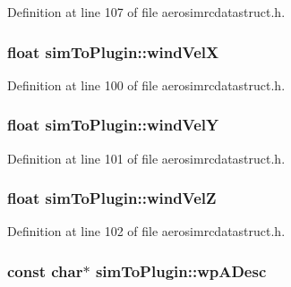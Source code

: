 \-Definition at line 107 of file aerosimrcdatastruct.\-h.

\hypertarget{group___aero_sim_r_c_ga28ae11206edb7d479d61f42edfe59a6a}{
\subsubsection[{wind\-Vel\-X}]{\setlength{\rightskip}{0pt plus 5cm}float {\bf sim\-To\-Plugin\-::wind\-Vel\-X}}}\label{group___aero_sim_r_c_ga28ae11206edb7d479d61f42edfe59a6a}


\-Definition at line 100 of file aerosimrcdatastruct.\-h.

\hypertarget{group___aero_sim_r_c_ga4a4ed34bd3c1e67d51b1d5b2272cbf3f}{
\subsubsection[{wind\-Vel\-Y}]{\setlength{\rightskip}{0pt plus 5cm}float {\bf sim\-To\-Plugin\-::wind\-Vel\-Y}}}\label{group___aero_sim_r_c_ga4a4ed34bd3c1e67d51b1d5b2272cbf3f}


\-Definition at line 101 of file aerosimrcdatastruct.\-h.

\hypertarget{group___aero_sim_r_c_ga28ceecb62e11bce71b44c63ea4af67aa}{
\subsubsection[{wind\-Vel\-Z}]{\setlength{\rightskip}{0pt plus 5cm}float {\bf sim\-To\-Plugin\-::wind\-Vel\-Z}}}\label{group___aero_sim_r_c_ga28ceecb62e11bce71b44c63ea4af67aa}


\-Definition at line 102 of file aerosimrcdatastruct.\-h.

\hypertarget{group___aero_sim_r_c_ga527aaa5fbbb0b3108b4ccace20e252d2}{
\subsubsection[{wp\-A\-Desc}]{\setlength{\rightskip}{0pt plus 5cm}const char$\ast$ {\bf sim\-To\-Plugin\-::wp\-A\-Desc}}}\label{group___aero_sim_r_c_ga527aaa5fbbb0b3108b4ccace20e252d2}


